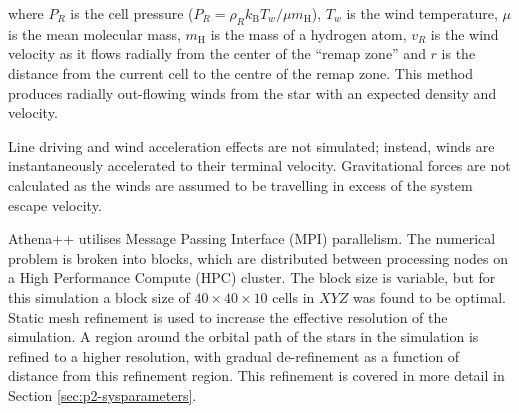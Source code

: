 \documentclass[fleqn,usenatbib]{mnras}
\begin{document}
\noindent
where $P_R$ is the cell pressure ($P_R = \rho_R k_\text{B} T_w / \mu m_\text{H}$), $T_w$ is the wind temperature, $\mu$ is the mean molecular mass, $m_\text{H}$ is the mass of a hydrogen atom, $v_R$ is the wind velocity as it flows radially from the center of the ``remap zone'' and $r$ is the distance from the current cell to the centre of the remap zone.
This method produces radially out-flowing winds from the star with an expected density and velocity.

Line driving and wind acceleration effects are not simulated;
instead, winds are instantaneously accelerated to their terminal velocity.
Gravitational forces are not calculated as the winds are assumed to be travelling in excess of the system escape velocity.

Athena++ utilises Message Passing Interface (MPI) parallelism.
The numerical problem is broken into blocks, which are distributed between processing nodes on a High Performance Compute (HPC) cluster.
The block size is variable, but for this simulation a block size of $40\times 40 \times 10$ cells in $XYZ$ was found to be optimal.
Static mesh refinement is used to increase the effective resolution of the simulation.
A region around the orbital path of the stars in the simulation is refined to a higher resolution, with gradual de-refinement as a function of distance from this refinement region.
This refinement is covered in more detail in Section \ref{sec:p2-sysparameters}.
\end{document}
